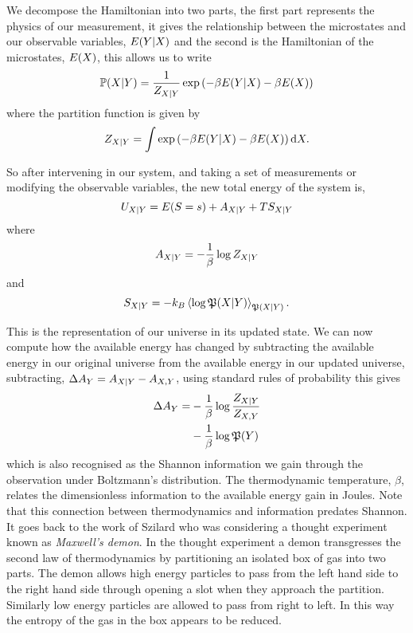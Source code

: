 \documentclass[]{article}
\begin{document}
We decompose the Hamiltonian into two parts, the first part represents the physics of our measurement, it gives the relationship between the microstates and our observable variables,
\(E(Y|X)\) and the second is the Hamiltonian of the microstates, \(E(X)\), this allows us to write
\[
\mathbb{P}({X|Y}) =
\frac{1}{Z_{X|Y}} \exp\left(-\beta
E(Y|X) -\beta E(X)\right)
\] 
where the partition function is given by
\[
Z_{X|Y} = \int \exp\left(-\beta
E(Y|X) -\beta E(X)\right)
\text{d}X.
\] 

So after intervening in our system, and taking a set of measurements or modifying the observable variables, the new total energy of the system is,
\[
U_{X|Y} =
E(S=s) +
A_{X|Y} +
TS_{X|Y}
\] 
where 
\[
A_{X|Y} = - \frac{1}{\beta}\log
Z_{X|Y}
\] 
and 
\[
S_{X|Y} = -k_B \left\langle \log
  \mathfrak{P}({X|Y}) \right\rangle_{\mathfrak{P}({X|Y})}.
\]

This is the representation of our universe in its updated state. We can now compute how the available energy has changed by subtracting the available energy in our original universe from the available energy in our updated universe, subtracting, $\Delta A_{Y} = A_{X|Y} -
  A_{X,Y}$, using standard rules of probability this gives
\begin{align*}
 \Delta A_{Y}  = & -\frac{1}{\beta} \log
  \frac{Z_{X|Y}}{Z_{X,Y}}\\ &
  -\frac{1}{\beta} \log \mathfrak{P}(Y)
\end{align*}
which is also recognised as the Shannon information we gain through the observation \citep{Shannon-info48} under Boltzmann's distribution. The thermodynamic temperature, $\beta$, relates the dimensionless information to the available energy gain in Joules. Note that this connection between thermodynamics and information predates Shannon. It goes back to the work of Szilard\citep{Szilard-intelligenter29} who was considering a thought experiment known as \emph{Maxwell's demon}\citep{Maxwell-theory71,Leff-maxwell90}. In the thought experiment a demon transgresses the second law of thermodynamics by partitioning an isolated box of gas into two parts. The demon allows high energy particles to pass from the left hand side to the right hand side through opening a slot when they approach the partition. Similarly low energy particles are allowed to pass from right to left. In this way the entropy of the gas in the box appears to be reduced. 
\end{document}
